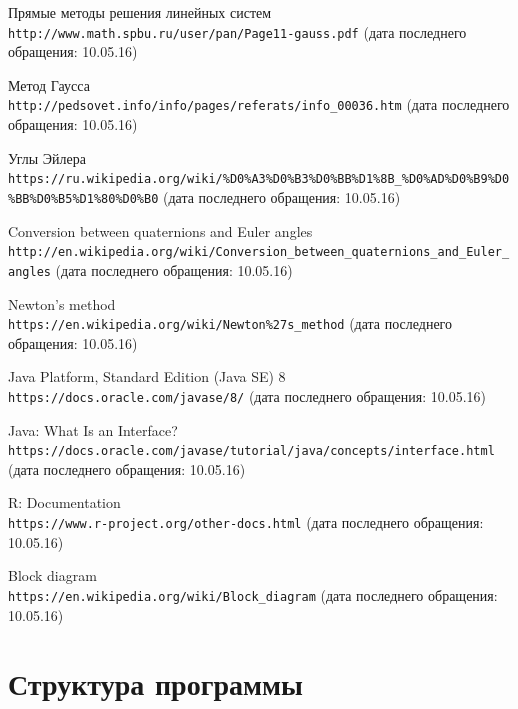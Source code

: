\documentclass[14pt]{extreport}
\begin{document}
\begin{thebibliography}{9}
Прямые методы решения линейных систем
\\\texttt{\small{http://www.math.spbu.ru/user/pan/Page11-gauss.pdf}}
(дата последнего обращения: 10.05.16)

Метод Гаусса
\\\texttt{\small{http://pedsovet.info/info/pages/referats/info\_00036.htm}}
(дата последнего обращения: 10.05.16)

Углы Эйлера
\\\texttt{\footnotesize {https://ru.wikipedia.org/wiki/\%D0\%A3\%D0\%B3\%D0\%BB\%D1\%8B\_\%D0\%AD\%D0\%B9\%D0\%BB\%D0\%B5\%D1\%80\%D0\%B0}}
(дата последнего обращения: 10.05.16)

Conversion between quaternions and Euler angles
\\\texttt{\small{http://en.wikipedia.org/wiki/Conversion\_between\_quaternions\_and\_Euler\_angles}}
(дата последнего обращения: 10.05.16)

Newton's method
\\\texttt{\small{https://en.wikipedia.org/wiki/Newton\%27s\_method}}
(дата последнего обращения: 10.05.16)

Java Platform, Standard Edition (Java SE) 8
\\\texttt{\small{https://docs.oracle.com/javase/8/}}
(дата последнего обращения: 10.05.16)

Java: What Is an Interface?
\\\texttt{\small{https://docs.oracle.com/javase/tutorial/java/concepts/interface.html}}
(дата последнего обращения: 10.05.16)

R: Documentation
\\\texttt{\small{https://www.r-project.org/other-docs.html}}
(дата последнего обращения: 10.05.16)

Block diagram
\\\texttt{\small{https://en.wikipedia.org/wiki/Block\_diagram}}
(дата последнего обращения: 10.05.16)

\end{thebibliography}

\Appendix %

\chapter{Структура программы}
\end{document}
